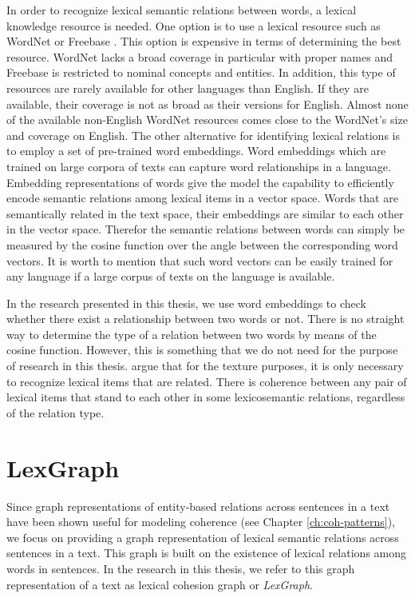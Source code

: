 In order to recognize lexical semantic relations between words, a lexical knowledge resource is needed.   
One option is to use a lexical resource such as WordNet \cite{fellbaum98} or Freebase \cite{bollacker08}.  
This option is expensive in terms of determining the best resource.  
WordNet lacks a broad coverage in particular with proper names and Freebase is restricted to nominal concepts and entities. 
In addition, this type of resources are rarely available for other languages than English.
If they are available, their coverage is not as broad as their versions for English. 
Almost none of the available non-English WordNet resources comes close to the WordNet's size and coverage on English. 
The other alternative for identifying lexical relations is to employ a set of pre-trained word embeddings. 
Word embeddings which are trained on large corpora of texts can capture word relationships in a language. 
Embedding representations of words give the model the capability to efficiently encode semantic relations among lexical items in a vector space. 
Words that are semantically related in the text space, their embeddings are similar to each other in the vector space. 
Therefor the semantic relations between words can simply be measured by the cosine function over the angle between the corresponding word vectors. 
It is worth to mention that such word vectors can be easily trained for any language if a large corpus of texts on the language is available.  

In the research presented in this thesis, we use word embeddings to check whether there exist a relationship between two words or not.  
There is no straight way to determine the type of a relation between two words by means of the cosine function. 
However, this is something that we do not need for the purpose of research in this thesis. 
 argue that for the texture purposes, it is only necessary to recognize lexical items that are related. 
There is coherence between any pair of lexical items that stand to each other in some lexicosemantic relations, regardless of the relation type. 

\section{LexGraph}
\label{sec:lex-graph-representation}

Since graph representations of entity-based relations across sentences in a text have been shown useful for modeling coherence (see Chapter \ref{ch:coh-patterns}), we focus on providing a graph representation of lexical semantic relations across sentences in a text. 
This graph is built on the existence of lexical relations among words in sentences. 
In the research in this thesis, we refer to this graph representation of a text as lexical cohesion graph or \emph{LexGraph}. 

